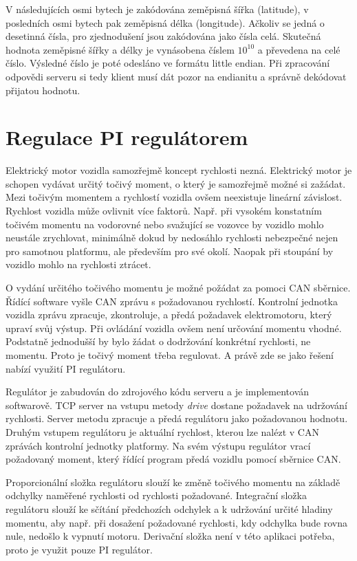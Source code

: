 \documentclass[czech, bachelor]{diploma}
\begin{document}
V následujících osmi bytech je zakódována zeměpisná šířka (latitude), v posledních osmi bytech pak zeměpisná délka (longitude).
Ačkoliv se jedná o desetinná čísla, pro zjednodušení jsou zakódována jako čísla celá. Skutečná hodnota zeměpisné šířky a délky
je vynásobena číslem $10^{10}$ a převedena na celé číslo. Výsledné číslo je poté odesláno ve formátu little endian. Při zpracování
odpovědi serveru si tedy klient musí dát pozor na endianitu a správně dekódovat přijatou hodnotu.

\section{Regulace PI regulátorem} \label{pi-controller}
Elektrický motor vozidla samozřejmě koncept rychlosti nezná. Elektrický motor je schopen vydávat určitý točivý moment, o který
je samozřejmě možné si zažádat. Mezi točivým momentem a rychlostí vozidla ovšem neexistuje lineární závislost. Rychlost vozidla
může ovlivnit více faktorů. Např. při vysokém konstatním točivém momentu na vodorovné nebo svažující se vozovce by vozidlo mohlo
neustále zrychlovat, minimálně dokud by nedosáhlo rychlosti nebezpečné nejen pro samotnou platformu, ale především pro své okolí.
Naopak při stoupání by vozidlo mohlo na rychlosti ztrácet.

O vydání určitého točivého momentu je možné požádat za pomoci CAN sběrnice. Řídící software vyšle CAN zprávu s požadovanou
rychlostí. Kontrolní jednotka vozidla zprávu zpracuje, zkontroluje, a předá požadavek elektromotoru, který upraví svůj výstup.
Při ovládání vozidla ovšem není určování momentu vhodné. Podstatně jednodušší by bylo žádat o dodržování konkrétní rychlosti,
ne momentu. Proto je točivý moment třeba regulovat. A právě zde se jako řešení nabízí využití PI regulátoru.

Regulátor je zabudován do zdrojového kódu serveru a je implementován softwarově. TCP server na vstupu metody \emph{drive} dostane
požadavek na udržování rychlosti. Server metodu zpracuje a předá regulátoru jako požadovanou hodnotu. Druhým vstupem regulátoru
je aktuální rychlost, kterou lze nalézt v CAN zprávách kontrolní jednotky platformy. Na svém výstupu regulátor vrací požadovaný
moment, který řídící program předá vozidlu pomocí sběrnice CAN.

Proporcionální složka regulátoru slouží ke změně točivého momentu na základě odchylky naměřené rychlosti od rychlosti požadované.
Integrační složka regulátoru slouží ke sčítání předchozích odchylek a k udržování určité hladiny momentu, aby např. při dosažení
požadované rychlosti, kdy odchylka bude rovna nule, nedošlo k vypnutí motoru. Derivační složka není v této aplikaci potřeba, proto
je využit pouze PI regulátor.
\end{document}
